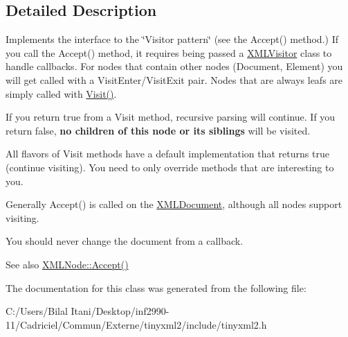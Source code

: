 \subsection{Detailed Description}
Implements the interface to the \char`\"{}\+Visitor pattern\char`\"{} (see the Accept() method.) If you call the Accept() method, it requires being passed a \hyperlink{classtinyxml2_1_1_x_m_l_visitor}{X\+M\+L\+Visitor} class to handle callbacks. For nodes that contain other nodes (Document, Element) you will get called with a Visit\+Enter/\+Visit\+Exit pair. Nodes that are always leafs are simply called with \hyperlink{classtinyxml2_1_1_x_m_l_visitor_adc75bd459fc7ba8223b50f0616767f9a}{Visit()}.

If you return \textquotesingle{}true\textquotesingle{} from a Visit method, recursive parsing will continue. If you return false, {\bfseries no children of this node or its siblings} will be visited.

All flavors of Visit methods have a default implementation that returns \textquotesingle{}true\textquotesingle{} (continue visiting). You need to only override methods that are interesting to you.

Generally Accept() is called on the \hyperlink{classtinyxml2_1_1_x_m_l_document}{X\+M\+L\+Document}, although all nodes support visiting.

You should never change the document from a callback.

\begin{DoxySeeAlso}{See also}
\hyperlink{classtinyxml2_1_1_x_m_l_node_a366ad0e9b9ae8d1b18c00f903994b7a9}{X\+M\+L\+Node\+::\+Accept()} 
\end{DoxySeeAlso}


The documentation for this class was generated from the following file\+:\begin{DoxyCompactItemize}
\item 
C\+:/\+Users/\+Bilal Itani/\+Desktop/inf2990-\/11/\+Cadriciel/\+Commun/\+Externe/tinyxml2/include/tinyxml2.\+h\end{DoxyCompactItemize}
